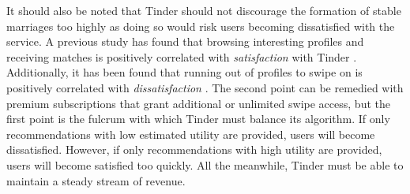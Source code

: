 It should also be noted that Tinder should not discourage the formation of stable marriages too highly as doing so would risk users becoming dissatisfied with the service. A previous study has found that browsing interesting profiles and receiving matches is positively correlated with \textit{satisfaction} with Tinder \citep{Courtois2018}. Additionally, it has been found that running out of profiles to swipe on is positively correlated with \textit{dissatisfaction} \citep{Courtois2018}. The second point can be remedied with premium subscriptions that grant additional or unlimited swipe access, but the first point is the fulcrum with which Tinder must balance its algorithm. If only recommendations with low estimated utility are provided, users will become dissatisfied. However, if only recommendations with high utility are provided, users will become satisfied too quickly. All the meanwhile, Tinder must be able to maintain a steady stream of revenue.